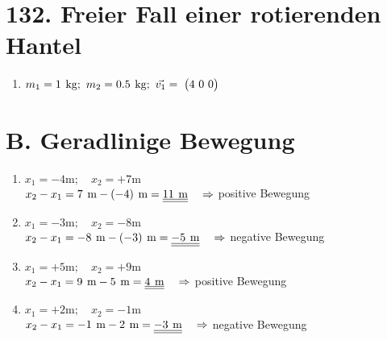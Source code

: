 \documentclass{alex_hü}
\begin{document}
\renewcommand{\labelenumi}{\alph{enumi})}


\section*{132. Freier Fall einer rotierenden Hantel}
\begin{enumerate}
	\item \(m_1 = 1 \si{kg};\ m_2 = 0.5 \si{kg};\ \vec{v_1} = \vector{4\ 0\ 0}   \)	
	
\end{enumerate}

\section*{B. Geradlinige Bewegung}
\begin{enumerate}
	\item $ x_1 = -4 \si{\m}; \quad x_2 = +7 \si{\m} $\\[1.5ex]
	$ x_2 - x_1 = 7 \si{\m} - (-4) \si{\m} = \dl{11 \si{\m}}\quad \Rightarrow$ positive Bewegung\\ 
	\item $ x_1 = -3 \si{\m}; \quad x_2 = -8 \si{\m} $\\[1.5ex]
	$ x_2 - x_1 = -8 \si{\m} - (-3) \si{\m} = \dl{-5 \si{\m}}\quad \Rightarrow$ negative Bewegung\\
	\item $ x_1 = +5 \si{\m}; \quad x_2 = +9 \si{\m} $\\[1.5ex]
	$ x_2 -x_1 = 9 \si{\m} - 5 \si{\m} = \dl{4 \si{\m}}\quad \Rightarrow$ positive Bewegung\\
	\item $ x_1 = +2 \si{\m}; \quad x_2 = -1 \si{\m}$\\[1.5ex]
	$ x_2 - x_1 = -1 \si{\m} - 2 \si{\m} = \dl{-3 \si{\m}}\quad \Rightarrow$ negative Bewegung
\end{enumerate}
\end{document}
